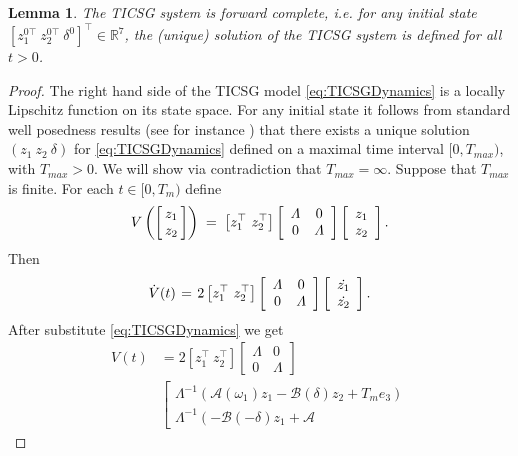 \documentclass[letterpaper, 10 pt, conference]{ieeeconf}
\newtheorem{lemma}[theorem]{Lemma}
\newcommand{\m}      {{\hbox{\hskip 1pt}}}
\newcommand{\nm}     {{\hbox{\hskip -3pt}}}
\begin{document}
\begin{lemma}\label{lemma:forewordComplete}
The TICSG system is forward complete, i.e. for any initial state
$\left[ z_1^{0\top} \ z_2^{0\top} \ \delta^{0} \right]^\top \in
\mathbb{R}^7 $, the (unique) solution of the TICSG system is defined
for all $t>0$.
\end{lemma}

\begin{proof} The right hand side of the TICSG model 
\eqref{eq:TICSGDynamics} is a locally Lipschitz function on its state
space. For any initial state it follows from standard well posedness
results (see for instance \cite[Ch. 3]{Khalil}) that there exists a
unique solution $( z_1 \ z_2 \ \delta )$ for \eqref{eq:TICSGDynamics}
defined on a maximal time interval $[0,T_{max})$, with $T_{max} >
0$. We will show via contradiction that $T_{max}=\infty$. Suppose that
$T_{max}$ is finite. For each $t\in [0,T_m)$ define
$$ V\left(\left[\nm\begin{array}{c} z_1\\ z_2\end{array}\nm\right]
   \right) \m=\m \left[z_1^\top\ z_2^\top\right]\left[\begin{array}
   {cc} \varLambda & 0\\ 0 & \varLambda \end{array}\right]\left[
   \begin{array}{c} z_1\\ z_2 \end{array}\right].$$
Then
$$ \dot{V}(t) \m=\m 2\left[z_1^\top\ z_2^\top\right]\left[
   \begin{array}{cc} \varLambda & 0\\ 0 & \varLambda \end{array}
   \right]\left[\begin{array}{c} \dot{z_1}\\ \dot{z_2}
   \end{array}\right].$$ 
After substitute \eqref{eq:TICSGDynamics} we get
$$ \begin{aligned} V(t) &= 2\left[z_1^\top\ z_2^\top\right]\left[
   \begin{array}{cc} \varLambda & 0\\ 0 & \varLambda \end{array}
   \right] \\ & \left[\begin{array}{c} \varLambda^{-1}\left(
   \mathcal{A}(\omega_1)z_1-\mathcal{B}(\delta)z_2+T_me_3\right)
   \\ \varLambda^{-1}\left(-\mathcal{B}(-\delta)z_1+\mathcal{A}

\end{array}
\end{aligned}$$
\end{proof}
\end{document}
